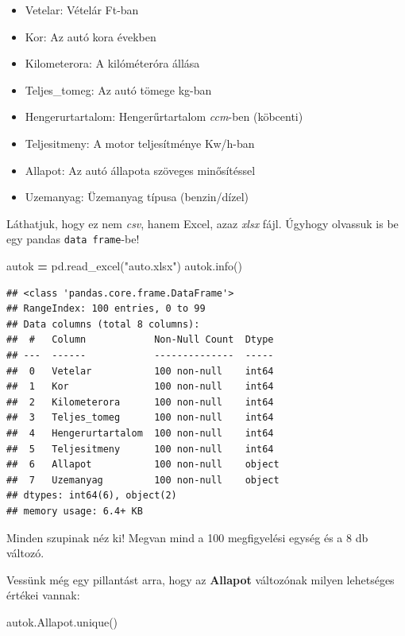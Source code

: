 \documentclass[
]{book}
\newenvironment{Shaded}{\begin{snugshade}}{\end{snugshade}}
\newcommand{\NormalTok}[1]{#1}
\newcommand{\OperatorTok}[1]{\textcolor[rgb]{0.81,0.36,0.00}{\textbf{#1}}}
\newcommand{\StringTok}[1]{\textcolor[rgb]{0.31,0.60,0.02}{#1}}
\providecommand{\tightlist}{%
  \setlength{\itemsep}{0pt}\setlength{\parskip}{0pt}}
\begin{document}
\begin{itemize}
\tightlist
\item
  Vetelar: Vételár Ft-ban
\item
  Kor: Az autó kora években
\item
  Kilometerora: A kilóméteróra állása
\item
  Teljes\_tomeg: Az autó tömege kg-ban
\item
  Hengerurtartalom: Hengerűrtartalom \emph{ccm}-ben (köbcenti)
\item
  Teljesitmeny: A motor teljesítménye Kw/h-ban
\item
  Allapot: Az autó állapota szöveges minősítéssel
\item
  Uzemanyag: Üzemanyag típusa (benzin/dízel)
\end{itemize}

Láthatjuk, hogy ez nem \emph{csv}, hanem Excel, azaz \emph{xlsx} fájl. Úgyhogy olvassuk is be egy pandas \texttt{data\ frame}-be!

\begin{Shaded}
\begin{Highlighting}[]
\NormalTok{autok }\OperatorTok{=}\NormalTok{ pd.read\_excel(}\StringTok{"auto.xlsx"}\NormalTok{)}
\NormalTok{autok.info()}
\end{Highlighting}
\end{Shaded}

\begin{verbatim}
## <class 'pandas.core.frame.DataFrame'>
## RangeIndex: 100 entries, 0 to 99
## Data columns (total 8 columns):
##  #   Column            Non-Null Count  Dtype 
## ---  ------            --------------  ----- 
##  0   Vetelar           100 non-null    int64 
##  1   Kor               100 non-null    int64 
##  2   Kilometerora      100 non-null    int64 
##  3   Teljes_tomeg      100 non-null    int64 
##  4   Hengerurtartalom  100 non-null    int64 
##  5   Teljesitmeny      100 non-null    int64 
##  6   Allapot           100 non-null    object
##  7   Uzemanyag         100 non-null    object
## dtypes: int64(6), object(2)
## memory usage: 6.4+ KB
\end{verbatim}

Minden szupinak néz ki! Megvan mind a 100 megfigyelési egység és a 8 db változó.

Vessünk még egy pillantást arra, hogy az \textbf{Allapot} változónak milyen lehetséges értékei vannak:

\begin{Shaded}
\begin{Highlighting}[]
\NormalTok{autok.Allapot.unique()}
\end{Highlighting}
\end{Shaded}
\end{document}
